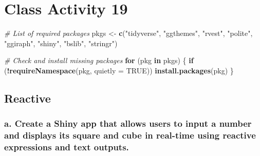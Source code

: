 \documentclass[
]{book}
\newenvironment{Shaded}{\begin{snugshade}}{\end{snugshade}}
\newcommand{\AttributeTok}[1]{\textcolor[rgb]{0.13,0.29,0.53}{#1}}
\newcommand{\CommentTok}[1]{\textcolor[rgb]{0.56,0.35,0.01}{\textit{#1}}}
\newcommand{\ConstantTok}[1]{\textcolor[rgb]{0.56,0.35,0.01}{#1}}
\newcommand{\ControlFlowTok}[1]{\textcolor[rgb]{0.13,0.29,0.53}{\textbf{#1}}}
\newcommand{\FunctionTok}[1]{\textcolor[rgb]{0.13,0.29,0.53}{\textbf{#1}}}
\newcommand{\NormalTok}[1]{#1}
\newcommand{\OtherTok}[1]{\textcolor[rgb]{0.56,0.35,0.01}{#1}}
\newcommand{\SpecialCharTok}[1]{\textcolor[rgb]{0.81,0.36,0.00}{\textbf{#1}}}
\newcommand{\StringTok}[1]{\textcolor[rgb]{0.31,0.60,0.02}{#1}}
\begin{document}
\hypertarget{class-activity-19}{%
\chapter{Class Activity 19}\label{class-activity-19}}

\begin{Shaded}
\begin{Highlighting}[]
\CommentTok{\# List of required packages}
\NormalTok{pkgs }\OtherTok{\textless{}{-}} \FunctionTok{c}\NormalTok{(}\StringTok{"tidyverse"}\NormalTok{, }\StringTok{"ggthemes"}\NormalTok{, }\StringTok{"rvest"}\NormalTok{, }\StringTok{"polite"}\NormalTok{, }\StringTok{"ggiraph"}\NormalTok{, }\StringTok{"shiny"}\NormalTok{, }\StringTok{"bslib"}\NormalTok{, }\StringTok{"stringr"}\NormalTok{)}

\CommentTok{\# Check and install missing packages}
\ControlFlowTok{for}\NormalTok{ (pkg }\ControlFlowTok{in}\NormalTok{ pkgs) \{}
  \ControlFlowTok{if}\NormalTok{ (}\SpecialCharTok{!}\FunctionTok{requireNamespace}\NormalTok{(pkg, }\AttributeTok{quietly =} \ConstantTok{TRUE}\NormalTok{)) }
    \FunctionTok{install.packages}\NormalTok{(pkg)}
\NormalTok{\}}
\end{Highlighting}
\end{Shaded}

\hypertarget{reactive}{%
\section{Reactive}\label{reactive}}

\hypertarget{a.-create-a-shiny-app-that-allows-users-to-input-a-number-and-displays-its-square-and-cube-in-real-time-using-reactive-expressions-and-text-outputs.}{%
\subsection{a. Create a Shiny app that allows users to input a number and displays its square and cube in real-time using reactive expressions and text outputs.}\label{a.-create-a-shiny-app-that-allows-users-to-input-a-number-and-displays-its-square-and-cube-in-real-time-using-reactive-expressions-and-text-outputs.}}
\end{document}
